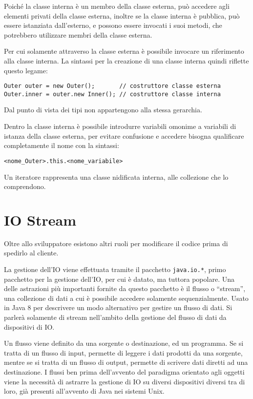 \documentclass{article}
\numberwithin{equation}{subsection}
\begin{document}
Poiché la classe interna è un membro della classe esterna, può accedere agli elementi privati della classe esterna, inoltre se la classe interna è pubblica, può essere istanziata 
dall'esterno, e possono essere invocati i suoi metodi, che potrebbero utilizzare membri della classe esterna. 

Per cui solamente attraverso la classe esterna è possibile invocare un riferimento alla classe interna. 
La sintassi per la creazione di una classe interna quindi riflette questo legame:
\begin{verbatim}
Outer outer = new Outer();       // costruttore classe esterna
Outer.inner = outer.new Inner(); // costruttore classe interna 
\end{verbatim}

Dal punto di vista dei tipi non appartengono alla stessa gerarchia. 

Dentro la classe interna è possibile introdurre variabili omonime a variabili di istanza della classe esterna, per evitare confusione e accedere bisogna qualificare 
completamente il nome con la sintassi:
\begin{verbatim}
<nome_Outer>.this.<nome_variabile>
\end{verbatim}


Un iteratore rappresenta una classe nidificata interna, alle collezione che lo comprendono. 


\clearpage

\section{IO Stream}

Oltre allo sviluppatore esistono altri ruoli per modificare il codice prima di spedirlo al cliente. 

La gestione dell'IO viene effettuata tramite il pacchetto \verb|java.io.*|, primo pacchetto per la gestione dell'IO, per cui è datato, ma tuttora popolare. 
Una delle astrazioni più importanti fornite da questo pacchetto è il flusso o ``stream'', una collezione di dati a cui è possibile accedere solamente sequenzialmente. 
Usato in Java 8 per descrivere un modo alternativo per gestire un flusso di dati. 
Si parlerà solamente di stream nell'ambito della gestione del flusso di dati da dispositivi di IO. 

Un flusso viene definito da una sorgente o destinazione, ed un programma. Se si tratta di un flusso di input, permette di leggere i dati prodotti da una sorgente, mentre se si tratta di un 
flusso di output, permette di scrivere dati diretti ad una destinazione. 
I flussi ben prima dell'avvento del paradigma orientato agli oggetti viene la necessità di astrarre la gestione di IO su diversi dispositivi diversi tra di loro, già presenti 
all'avvento di Java nei sistemi Unix. 
\end{document}
